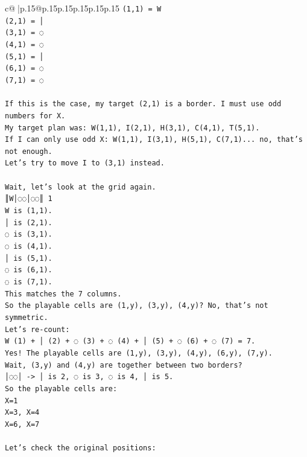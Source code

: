 \documentclass{article}
\begin{document}
{\begin{supertabular}{c@{$\;$}|p{.15\linewidth}@{}p{.15\linewidth}p{.15\linewidth}p{.15\linewidth}p{.15\linewidth}p{.15\linewidth}}
{{{\texttt{(1,1) = W} \\
\texttt{(2,1) = │} \\
\texttt{(3,1) = ◌} \\
\texttt{(4,1) = ◌} \\
\texttt{(5,1) = │} \\
\texttt{(6,1) = ◌} \\
\texttt{(7,1) = ◌} \\
\\ 
\texttt{If this is the case, my target (2,1) is a border. I must use odd numbers for X.} \\
\texttt{My target plan was: W(1,1), I(2,1), H(3,1), C(4,1), T(5,1).} \\
\texttt{If I can only use odd X: W(1,1), I(3,1), H(5,1), C(7,1)... no, that's not enough.} \\
\texttt{Let's try to move I to (3,1) instead.} \\
\\ 
\texttt{Wait, let's look at the grid again.} \\
\texttt{║W│◌◌│◌◌║ 1} \\
\texttt{W is (1,1).} \\
\texttt{│ is (2,1).} \\
\texttt{◌ is (3,1).} \\
\texttt{◌ is (4,1).} \\
\texttt{│ is (5,1).} \\
\texttt{◌ is (6,1).} \\
\texttt{◌ is (7,1).} \\
\texttt{This matches the 7 columns.} \\
\texttt{So the playable cells are (1,y), (3,y), (4,y)? No, that's not symmetric.} \\
\texttt{Let's re{-}count:} \\
\texttt{W (1) + │ (2) + ◌ (3) + ◌ (4) + │ (5) + ◌ (6) + ◌ (7) = 7.} \\
\texttt{Yes! The playable cells are (1,y), (3,y), (4,y), (6,y), (7,y).} \\
\texttt{Wait, (3,y) and (4,y) are together between two borders?} \\
\texttt{│◌◌│ {-}> │ is 2, ◌ is 3, ◌ is 4, │ is 5.} \\
\texttt{So the playable cells are:} \\
\texttt{X=1} \\
\texttt{X=3, X=4} \\
\texttt{X=6, X=7} \\
\\ 
\texttt{Let's check the original positions:} \\
}}}
\end{supertabular}}
\end{document}
